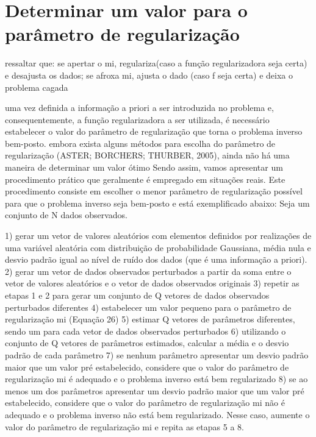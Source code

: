 \section{Determinar um valor para o parâmetro de regularização}

ressaltar que: se apertar o mi, regulariza(caso a função regularizadora seja certa) e desajusta
os dados; se afroxa mi, ajusta o dado (caso f seja certa) e deixa o problema cagada

uma vez definida a informação a priori a ser introduzida no problema e, consequentemente,
a função regularizadora a ser utilizada, é necessário estabelecer o valor do parâmetro de
regularização que torna o problema inverso bem-posto.
embora exista alguns métodos para escolha do parâmetro de regularização (ASTER;
BORCHERS; THURBER, 2005), ainda não há uma maneira de determinar um valor ótimo
Sendo assim, vamos apresentar um procedimento prático que geralmente é empregado em
situações reais. Este procedimento consiste em escolher o menor parâmetro de regularização
possível para que o problema inverso seja bem-posto e está exemplificado abaixo:
Seja um conjunto de N dados observados.

1) gerar um vetor de valores aleatórios com elementos definidos por realizações de uma
variável aleatória com distribuição de probabilidade Gaussiana, média nula e desvio padrão
igual ao nível de ruído dos dados (que é uma informação a priori).
2) gerar um vetor de dados observados perturbados a partir da soma entre o vetor de valores
aleatórios e o vetor de dados observados originais
3) repetir as etapas 1 e 2 para gerar um conjunto de Q vetores de dados observados
perturbados diferentes
4) estabelecer um valor pequeno para o parâmetro de regularização mi (Equação 26)
5) estimar Q vetores de parâmetros diferentes, sendo um para cada vetor de dados observados
perturbados
6) utilizando o conjunto de Q vetores de parâmetros estimados, calcular a média e o desvio
padrão de cada parâmetro
7) se nenhum parâmetro apresentar um desvio padrão maior que um valor pré estabelecido,
considere que o valor do parâmetro de regularização mi é adequado e o problema inverso está
bem regularizado
8) se ao menos um dos parâmetros apresentar um desvio padrão maior que um valor pré
estabelecido, considere que o valor do parâmetro de regularização mi não é adequado e o
problema inverso não está bem regularizado. Nesse caso, aumente o valor do parâmetro de
regularização mi e repita as etapas 5 a 8.
